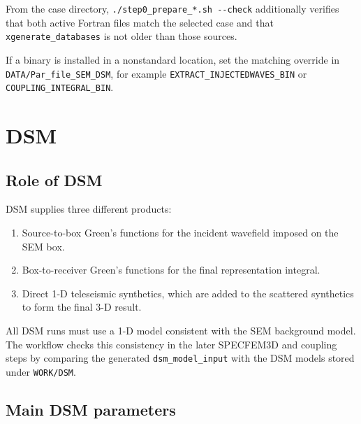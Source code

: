 \documentclass[11pt,oneside]{book}
\DeclareRobustCommand{\code}[1]{\nolinkurl{#1}}
\begin{document}
From the case directory, \code{./step0_prepare_*.sh --check} additionally
verifies that both active Fortran files match the selected case and that
\code{xgenerate_databases} is not older than those sources.

If a binary is installed in a nonstandard location, set the matching override
in \code{DATA/Par_file_SEM_DSM}, for example
\code{EXTRACT_INJECTEDWAVES_BIN} or \code{COUPLING_INTEGRAL_BIN}.

\chapter{DSM}

\section{Role of DSM}

DSM supplies three different products:
\begin{enumerate}[label=\arabic*.]
  \item Source-to-box Green's functions for the incident wavefield imposed on
  the SEM box.
  \item Box-to-receiver Green's functions for the final representation
  integral.
  \item Direct 1-D teleseismic synthetics, which are added to the scattered
  synthetics to form the final 3-D result.
\end{enumerate}

All DSM runs must use a 1-D model consistent with the SEM background model.
The workflow checks this consistency in the later SPECFEM3D and coupling
steps by comparing the generated \code{dsm_model_input} with the DSM models
stored under \code{WORK/DSM}.

\section{Main DSM parameters}
\end{document}
